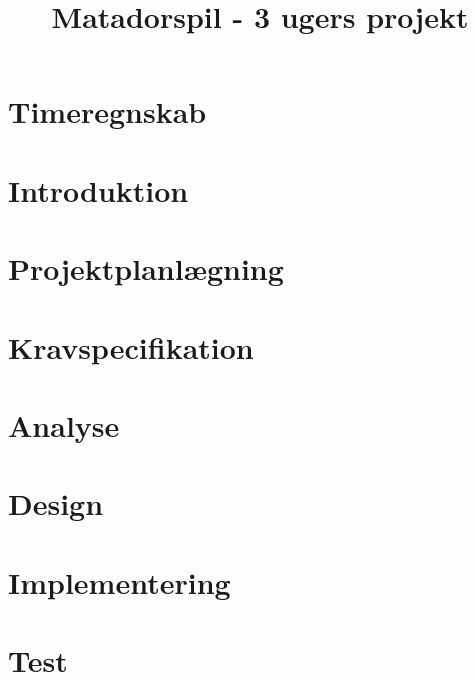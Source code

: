 \documentclass[12pt,oneside,a4paper,english]{article}
\title{Matadorspil - 3 ugers projekt} %
\begin{document}


\newpage

\thispagestyle{fancy}

\newpage
\doublespacing
\renewcommand{\baselinestretch}{1}\normalsize
\tableofcontents
\renewcommand{\baselinestretch}{1}\normalsize
\thispagestyle{fancy} %

\newpage
\section{Timeregnskab}

\thispagestyle{fancy}

\newpage
\section{Introduktion}
\thispagestyle{fancy}


\newpage
\section{Projektplanlægning}

\thispagestyle{fancy}

\newpage
\thispagestyle{fancy}
\section{Kravspecifikation}


\newpage
\section{Analyse}

\thispagestyle{fancy}

\newpage
\section{Design}

\thispagestyle{fancy}

\newpage
\section{Implementering}
\thispagestyle{fancy}

\newpage
\section{Test}

\thispagestyle{fancy}
\end{document}
